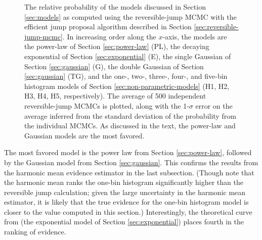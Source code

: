 \documentclass[preprint]{aastex}
\begin{document}
\begin{figure}
  \begin{center}
  \end{center}
  \caption{\label{fig:rj} The relative probability of the models
    discussed in Section \ref{sec:models} as computed using the
    reversible-jump MCMC with the efficient jump proposal algorithm
    described in Section \ref{sec:reversible-jump-mcmc}.  In
    increasing order along the $x$-axis, the models are the power-law
    of Section \ref{sec:power-law} (PL), the decaying exponential of
    Section \ref{sec:exponential} (E), the single Gaussian of Section
    \ref{sec:gaussian} (G), the double Gaussian of Section
    \ref{sec:gaussian} (TG), and the one-, two-, three-, four-, and
    five-bin histogram models of Section
    \ref{sec:non-parametric-models} (H1, H2, H3, H4, H5,
    respectively).  The average of 500 independent reversible-jump
    MCMCs is plotted, along with the 1-$\sigma$ error on the average
    inferred from the standard deviation of the probability from the
    individual MCMCs.  As discussed in the text, the power-law and
    Gaussian models are the most favored.}
\end{figure}

The most favored model is the power law from Section
\ref{sec:power-law}, followed by the Gaussian model from Section
\ref{sec:gaussian}.  This confirms the results from the harmonic mean
evidence estimator in the last subsection.  (Though note that the
harmonic mean ranks the one-bin histogram significantly higher than
the reversible jump calculation; given the large uncertainty in the
harmonic mean estimator, it is likely that the true evidence for the
one-bin histogram model is closer to the value computed in this
section.)  Interestingly, the theoretical curve from \citet{Fryer2001}
(the exponential model of Section \ref{sec:exponential}) places fourth
in the ranking of evidence.  
\end{document}
